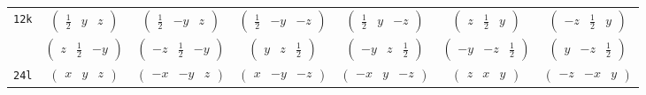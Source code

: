 \documentclass[fleqn,9pt,landscape]{jsarticle}
\begin{document}
\begin{center}
\begin{longtable}{ccccccc}
{\tt 12k} & $ \begin{pmatrix} \frac{1}{2} & y & z \end{pmatrix} $ & $ \begin{pmatrix} \frac{1}{2} & - y & z \end{pmatrix} $ & $ \begin{pmatrix} \frac{1}{2} & - y & - z \end{pmatrix} $ & $ \begin{pmatrix} \frac{1}{2} & y & - z \end{pmatrix} $ & $ \begin{pmatrix} z & \frac{1}{2} & y \end{pmatrix} $ & $ \begin{pmatrix} - z & \frac{1}{2} & y \end{pmatrix} $ \\
& $ \begin{pmatrix} z & \frac{1}{2} & - y \end{pmatrix} $ & $ \begin{pmatrix} - z & \frac{1}{2} & - y \end{pmatrix} $ & $ \begin{pmatrix} y & z & \frac{1}{2} \end{pmatrix} $ & $ \begin{pmatrix} - y & z & \frac{1}{2} \end{pmatrix} $ & $ \begin{pmatrix} - y & - z & \frac{1}{2} \end{pmatrix} $ & $ \begin{pmatrix} y & - z & \frac{1}{2} \end{pmatrix} $ \\ \hline
{\tt 24l} & $ \begin{pmatrix} x & y & z \end{pmatrix} $ & $ \begin{pmatrix} - x & - y & z \end{pmatrix} $ & $ \begin{pmatrix} x & - y & - z \end{pmatrix} $ & $ \begin{pmatrix} - x & y & - z \end{pmatrix} $ & $ \begin{pmatrix} z & x & y \end{pmatrix} $ & $ \begin{pmatrix} - z & - x & y \end{pmatrix} $ \\

\end{longtable}
\end{center}
\end{document}
